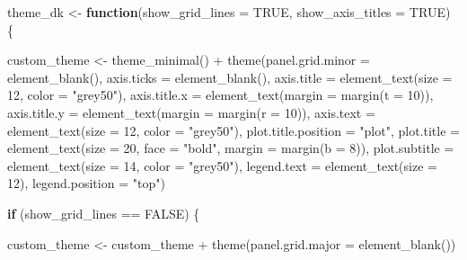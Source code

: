 \documentclass[
]{book}
\newenvironment{Shaded}{\begin{snugshade}}{\end{snugshade}}
\newcommand{\AttributeTok}[1]{\textcolor[rgb]{0.77,0.63,0.00}{#1}}
\newcommand{\ConstantTok}[1]{\textcolor[rgb]{0.00,0.00,0.00}{#1}}
\newcommand{\ControlFlowTok}[1]{\textcolor[rgb]{0.13,0.29,0.53}{\textbf{#1}}}
\newcommand{\DecValTok}[1]{\textcolor[rgb]{0.00,0.00,0.81}{#1}}
\newcommand{\FunctionTok}[1]{\textcolor[rgb]{0.00,0.00,0.00}{#1}}
\newcommand{\NormalTok}[1]{#1}
\newcommand{\OtherTok}[1]{\textcolor[rgb]{0.56,0.35,0.01}{#1}}
\newcommand{\SpecialCharTok}[1]{\textcolor[rgb]{0.00,0.00,0.00}{#1}}
\newcommand{\StringTok}[1]{\textcolor[rgb]{0.31,0.60,0.02}{#1}}
\begin{document}
\begin{Shaded}
\begin{Highlighting}[]
\NormalTok{theme\_dk }\OtherTok{\textless{}{-}} \ControlFlowTok{function}\NormalTok{(}\AttributeTok{show\_grid\_lines =} \ConstantTok{TRUE}\NormalTok{,}
                     \AttributeTok{show\_axis\_titles =} \ConstantTok{TRUE}\NormalTok{) \{}
  
\NormalTok{  custom\_theme }\OtherTok{\textless{}{-}} \FunctionTok{theme\_minimal}\NormalTok{() }\SpecialCharTok{+}
    \FunctionTok{theme}\NormalTok{(}\AttributeTok{panel.grid.minor =} \FunctionTok{element\_blank}\NormalTok{(),}
          \AttributeTok{axis.ticks =} \FunctionTok{element\_blank}\NormalTok{(),}
          \AttributeTok{axis.title =} \FunctionTok{element\_text}\NormalTok{(}\AttributeTok{size =} \DecValTok{12}\NormalTok{,}
                                   \AttributeTok{color =} \StringTok{"grey50"}\NormalTok{),}
          \AttributeTok{axis.title.x =} \FunctionTok{element\_text}\NormalTok{(}\AttributeTok{margin =} \FunctionTok{margin}\NormalTok{(}\AttributeTok{t =} \DecValTok{10}\NormalTok{)),}
          \AttributeTok{axis.title.y =} \FunctionTok{element\_text}\NormalTok{(}\AttributeTok{margin =} \FunctionTok{margin}\NormalTok{(}\AttributeTok{r =} \DecValTok{10}\NormalTok{)),}
          \AttributeTok{axis.text =} \FunctionTok{element\_text}\NormalTok{(}\AttributeTok{size =} \DecValTok{12}\NormalTok{,}
                                   \AttributeTok{color =} \StringTok{"grey50"}\NormalTok{),}
          \AttributeTok{plot.title.position =} \StringTok{"plot"}\NormalTok{,}
          \AttributeTok{plot.title =} \FunctionTok{element\_text}\NormalTok{(}\AttributeTok{size =} \DecValTok{20}\NormalTok{,}
                                    \AttributeTok{face =} \StringTok{"bold"}\NormalTok{,}
                                    \AttributeTok{margin =} \FunctionTok{margin}\NormalTok{(}\AttributeTok{b =} \DecValTok{8}\NormalTok{)),}
          \AttributeTok{plot.subtitle =} \FunctionTok{element\_text}\NormalTok{(}\AttributeTok{size =} \DecValTok{14}\NormalTok{,}
                                       \AttributeTok{color =} \StringTok{"grey50"}\NormalTok{),}
          \AttributeTok{legend.text =} \FunctionTok{element\_text}\NormalTok{(}\AttributeTok{size =} \DecValTok{12}\NormalTok{),}
          \AttributeTok{legend.position =} \StringTok{"top"}\NormalTok{)}
  
  \ControlFlowTok{if}\NormalTok{ (show\_grid\_lines }\SpecialCharTok{==} \ConstantTok{FALSE}\NormalTok{) \{}
    
\NormalTok{    custom\_theme }\OtherTok{\textless{}{-}}\NormalTok{ custom\_theme }\SpecialCharTok{+}
      \FunctionTok{theme}\NormalTok{(}\AttributeTok{panel.grid.major =} \FunctionTok{element\_blank}\NormalTok{())}
    

\end{Highlighting}
\end{Shaded}
\end{document}
